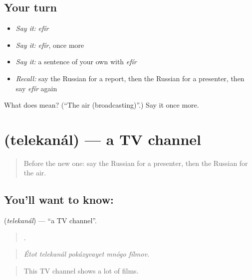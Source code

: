 \subsection*{Your turn}
\begin{itemize}
\raggedright
  \item \emph{Say it:} \emph{efír}
  \item \emph{Say it:} \emph{efír}, once more
  \item \emph{Say it:} a sentence of your own with \emph{efír}
  \item \emph{Recall:} say the Russian for a report, then the Russian for a presenter, then say \emph{efír} again
\end{itemize}

\begin{tcolorbox}[breakable,colback=teal!4,colframe=teal!35!black,title={Before you move on}]
What does  mean? (\textquotedblleft{}The air (broadcasting)\textquotedblright{}.) Say it once more.
\end{tcolorbox}
\section[\texorpdfstring{\ru{телеканал} (telekanál)}{телеканал (telekanál)}]{ (telekanál) — a TV channel}

\label{lesson:RU-C281-telekanal}



\begin{quote}
Before the new one: say the Russian for a presenter, then the Russian for the air.
\end{quote}

\subsection*{You'll want to know: }
\textbf{} (\emph{telekanál}) — \textquotedblleft{}a TV channel\textquotedblright{}.

\begin{quote}
    .
\end{quote}

\begin{quote}
\emph{Étot telekanál pokázyvayet mnógo fílmov.}
\end{quote}

\begin{quote}
This TV channel shows a lot of films.
\end{quote}

